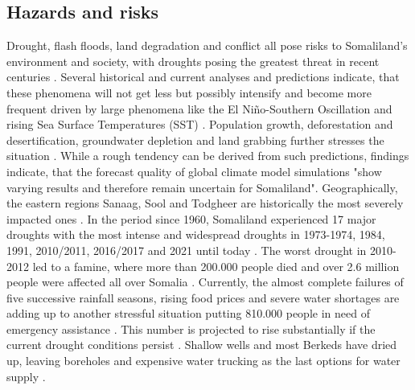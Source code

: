 
\subsection{Hazards and risks}

Drought, flash floods, land degradation and conflict all pose risks to Somaliland's environment and society, with droughts posing the greatest threat in recent centuries \autocite{abdulkadirAssessmentDroughtRecurrence2017}. Several historical and current analyses and predictions indicate, that these phenomena will not get less but possibly intensify and become more frequent driven by large phenomena like the El Niño-Southern Oscillation and rising Sea Surface Temperatures (SST) \autocite{abdulkadirAssessmentDroughtRecurrence2017,aliMitigatingNaturalDisasters2017a, balintMonitoringDroughtCombined2013, erianGARSpecialReport2021, FAOSWALIMSomalia, museiSPEIbasedSpatialTemporal2021, nationaldroughtcommitteeSOMALILANDDROUGHTRAPID2022,trisosAfrica2022}. Population growth, deforestation and desertification, groundwater depletion and land grabbing further stresses the situation \autocite{aliMitigatingNaturalDisasters2017a}. While a rough tendency can be derived from such predictions, \autocite[10]{abdulkadirAssessmentDroughtRecurrence2017} findings indicate, that the forecast quality of global climate model simulations "show varying results and therefore remain uncertain for Somaliland". 
Geographically, the eastern regions Sanaag, Sool and Todgheer are historically the most severely impacted ones \autocite{abdulkadirAssessmentDroughtRecurrence2017, FAOSWALIMSomalia}. In the period since 1960, Somaliland experienced 17 major droughts with the most intense and widespread droughts in 1973-1974, 1984, 1991, 2010/2011, 2016/2017 and 2021 until today \autocite{abdulkadirAssessmentDroughtRecurrence2017, credEMDATInternationalDisasters2023}. The worst drought in 2010-2012 led to a famine, where more than 200.000 people died and over 2.6 million people were affected all over Somalia \autocite{srcsDRMStrategicPlan2021}.
Currently, the almost complete failures of five successive rainfall seasons, rising food prices and severe water shortages are adding up to another stressful situation putting 810.000 people in need of emergency assistance \autocite{nationaldroughtcommitteeSOMALILANDDROUGHTRAPID2022}. This number is projected to rise substantially if the current drought conditions persist \autocite{swansonNearlyMillionPeople2022}. Shallow wells and most Berkeds have dried up, leaving boreholes and expensive water trucking as the last options for water supply \autocite{nationaldroughtcommitteeSOMALILANDDROUGHTRAPID2022}.
